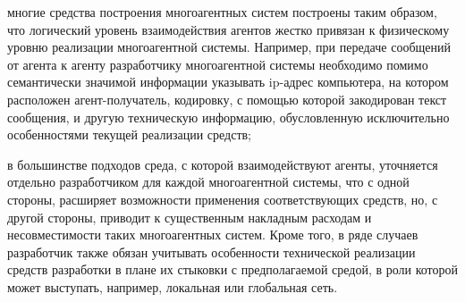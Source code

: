 \begin{textitemize}
\item многие средства построения многоагентных систем построены таким образом, что логический уровень взаимодействия агентов жестко привязан к физическому уровню реализации многоагентной системы. Например, при передаче сообщений от агента к агенту разработчику многоагентной системы необходимо помимо семантически значимой информации указывать ip-адрес компьютера, на котором расположен агент-получатель, кодировку, с помощью которой закодирован текст сообщения, и другую техническую информацию, обусловленную исключительно особенностями текущей реализации средств;
\item в большинстве подходов среда, с которой взаимодействуют агенты, уточняется отдельно разработчиком для каждой многоагентной системы, что с одной стороны, расширяет возможности применения соответствующих средств, но, с другой стороны, приводит к существенным накладным расходам и несовместимости таких многоагентных систем. Кроме того, в ряде случаев разработчик также обязан учитывать особенности технической реализации средств разработки в плане их стыковки с предполагаемой средой, в роли которой может выступать, например, локальная или глобальная сеть.
\end{textitemize}

